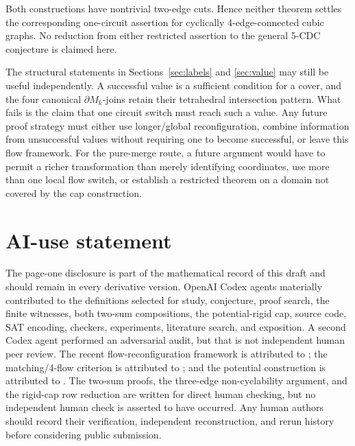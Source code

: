 \documentclass[11pt]{article}
\theoremstyle{definition}
\theoremstyle{remark}
\newcommand{\bd}{\partial}
\begin{document}
Both constructions have nontrivial two-edge cuts.  Hence neither theorem
settles the corresponding one-circuit assertion for cyclically
4-edge-connected cubic graphs.  No reduction from either restricted
assertion to the general 5-CDC conjecture is claimed here.

The structural statements in Sections~\ref{sec:labels} and
\ref{sec:value} may still be useful independently.  A successful value
is a sufficient condition for a cover, and the four canonical
\(\bd M_k\)-joins retain their tetrahedral intersection pattern.  What
fails is the claim that one circuit switch must reach such a value.  Any
future proof strategy must either use longer/global reconfiguration,
combine information from unsuccessful values without requiring one to
become successful, or leave this flow framework.  For the pure-merge
route, a future argument would have to permit a richer transformation
than merely identifying coordinates, use more than one local flow
switch, or establish a restricted theorem on a domain not covered by the
cap construction.

\section*{AI-use statement}

The page-one disclosure is part of the mathematical record of this draft
and should remain in every derivative version.  OpenAI Codex agents
materially contributed to the definitions selected for study, conjecture,
proof search, the finite witnesses, both two-sum compositions, the
potential-rigid cap, source code, SAT encoding, checkers, experiments,
literature search, and exposition.
A second Codex agent performed an adversarial audit, but that is not
independent human peer review.  The recent flow-reconfiguration
framework is attributed to \cite{esperet2025,cranston2026}; the
matching/4-flow criterion is attributed to \cite{hoffmann2013}; and the
potential construction is attributed to \cite{oum2026,kintali2026}.  The two-sum
proofs, the three-edge non-cyclability argument, and the rigid-cap row
reduction are written for direct human checking, but no independent
human check is asserted to have occurred.  Any human authors should
record their verification, independent reconstruction, and rerun history
before considering public submission.



\end{document}
